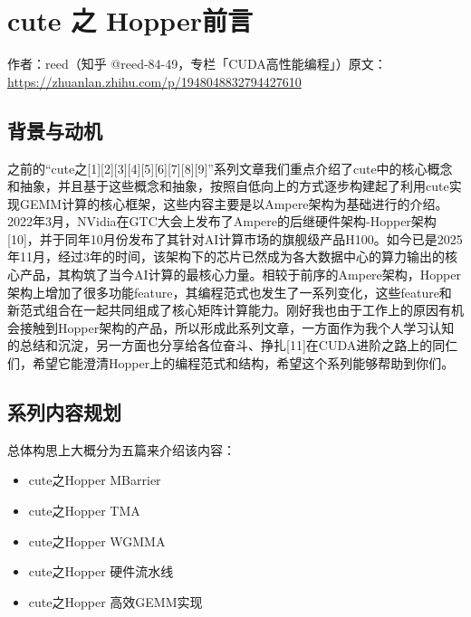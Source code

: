 \chapter{cute 之 Hopper前言}

\begin{center}\small 作者：reed（知乎 @reed-84-49，专栏「CUDA高性能编程」）\quad 原文：\url{https://zhuanlan.zhihu.com/p/1948048832794427610}\end{center}

\section{背景与动机}

之前的“cute之[1][2][3][4][5][6][7][8][9]”系列文章我们重点介绍了cute中的核心概念和抽象，并且基于这些概念和抽象，按照自低向上的方式逐步构建起了利用cute实现GEMM计算的核心框架，这些内容主要是以Ampere架构为基础进行的介绍。2022年3月，NVidia在GTC大会上发布了Ampere的后继硬件架构-Hopper架构[10]，并于同年10月份发布了其针对AI计算市场的旗舰级产品H100。如今已是2025年11月，经过3年的时间，该架构下的芯片已然成为各大数据中心的算力输出的核心产品，其构筑了当今AI计算的最核心力量。相较于前序的Ampere架构，Hopper架构上增加了很多功能feature，其编程范式也发生了一系列变化，这些feature和新范式组合在一起共同组成了核心矩阵计算能力。刚好我也由于工作上的原因有机会接触到Hopper架构的产品，所以形成此系列文章，一方面作为我个人学习认知的总结和沉淀，另一方面也分享给各位奋斗、挣扎[11]在CUDA进阶之路上的同仁们，希望它能澄清Hopper上的编程范式和结构，希望这个系列能够帮助到你们。

\section{系列内容规划}

总体构思上大概分为五篇来介绍该内容：

\begin{itemize}
  \item cute之Hopper MBarrier
  \item cute之Hopper TMA
  \item cute之Hopper WGMMA
  \item cute之Hopper 硬件流水线
  \item cute之Hopper 高效GEMM实现
\end{itemize}
